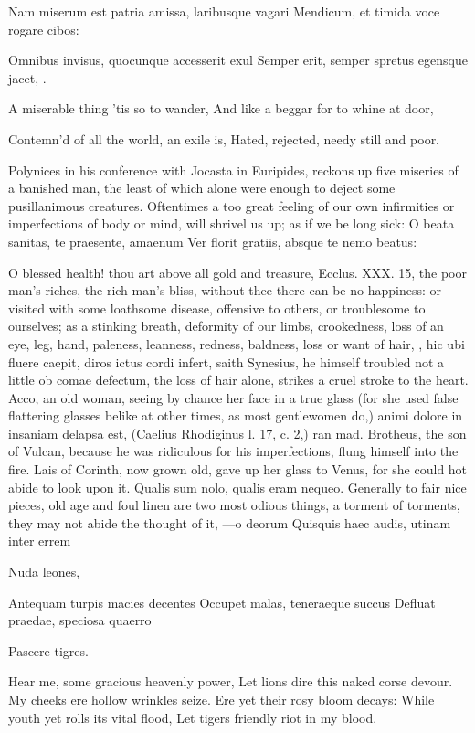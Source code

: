{Nam miserum est patria amissa, laribusque vagari
Mendicum, et timida voce rogare cibos:

Omnibus invisus, quocunque accesserit exul
Semper erit, semper spretus egensque jacet, \etc{}.


A miserable thing 'tis so to wander,
And like a beggar for to whine at door,

Contemn'd of all the world, an exile is,
Hated, rejected, needy still and poor.

Polynices in his conference with Jocasta in Euripides, reckons up
five miseries of a banished man, the least of which alone were enough
to deject some pusillanimous creatures. Oftentimes a too great feeling
of our own infirmities or imperfections of body or mind, will shrivel
us up; as if we be long sick:
O beata sanitas, te praesente, amaenum
Ver florit gratiis, absque te nemo beatus:

O blessed health! thou art above all gold and treasure, Ecclus. XXX.
15, the poor man's riches, the rich man's bliss, without thee there can
be no happiness: or visited with some loathsome disease, offensive to
others, or troublesome to ourselves; as a stinking breath, deformity of
our limbs, crookedness, loss of an eye, leg, hand, paleness, leanness,
redness, baldness, loss or want of hair, \etc{}, hic ubi fluere caepit,
diros ictus cordi infert, saith Synesius, he himself troubled not
a little ob comae defectum, the loss of hair alone, strikes a cruel
stroke to the heart. Acco, an old woman, seeing by chance her face in a
true glass (for she used false flattering glasses belike at other
times, as most gentlewomen do,) animi dolore in insaniam delapsa est,
(Caelius Rhodiginus l. 17, c. 2,) ran mad. Brotheus, the son of
Vulcan, because he was ridiculous for his imperfections, flung himself
into the fire. Lais of Corinth, now grown old, gave up her glass to
Venus, for she could hot abide to look upon it. Qualis sum nolo,
qualis eram nequeo. Generally to fair nice pieces, old age and foul
linen are two most odious things, a torment of torments, they may not
abide the thought of it,
---o deorum
Quisquis haec audis, utinam inter errem

Nuda leones,

Antequam turpis macies decentes
Occupet malas, teneraeque succus
Defluat praedae, speciosa quaerro

Pascere tigres.


Hear me, some gracious heavenly power,
Let lions dire this naked corse devour.
My cheeks ere hollow wrinkles seize.
Ere yet their rosy bloom decays:
While youth yet rolls its vital flood,
Let tigers friendly riot in my blood.

}
